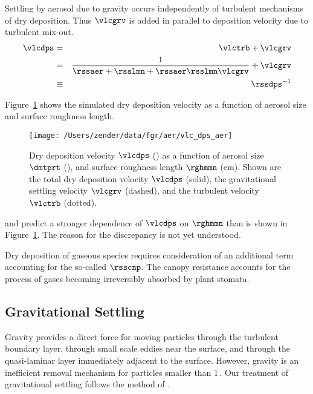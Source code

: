 \documentclass[12pt,twoside]{book}
\begin{document}
Settling by aerosol due to gravity occurs independently of turbulent 
mechanisms of dry deposition.
Thus $\vlcgrv$ is added in parallel to deposition velocity due to
turbulent mix-out.
\begin{eqnarray}
\vlcdps & = & \vlctrb + \vlcgrv \nonumber \\
\label{eqn:vlc_dps_dfn}
& = & \frac{1}{\rssaer + \rsslmn + \rssaer \rsslmn \vlcgrv } + \vlcgrv \\
\label{eqn:rss_dps_dfn}
& \equiv & \rssdps^{-1}
\end{eqnarray}

Figure~\ref{fgr:vlc_dps_aer} shows the simulated dry deposition velocity
as a function of aerosol size and surface roughness length.
\begin{figure*}
\begin{center}
\texttt{[image: /Users/zender/data/fgr/aer/vlc\_dps\_aer]}\vfill
\end{center}
\caption[Dry Deposition Velocity]{
Dry deposition velocity $\vlcdps$ (\cmxs) as a function of aerosol
size $\dmtprt$ (\um), and surface roughness length $\rghmmn$ (cm).
Shown are the total dry deposition velocity $\vlcdps$ (solid), 
the gravitational settling velocity $\vlcgrv$ (dashed), and the
turbulent velocity $\vlctrb$ (dotted).
\label{fgr:vlc_dps_aer}}
\end{figure*}
\cite{SeH78} and \cite{Seh80} predict a stronger dependence of
$\vlcdps$ on $\rghmmn$ than is shown in Figure~\ref{fgr:vlc_dps_aer}.
The reason for the discrepancy is not yet understood.

Dry deposition of gaseous species requires consideration of an
additional term accounting for the so-called  $\rsscnp$. 
The canopy resistance accounts for the process of gases becoming
irreversibly absorbed by plant stomata.

\subsection[Gravitational Settling]{Gravitational
Settling}\label{sxn:grv} 
Gravity provides a direct force for moving particles through the
turbulent boundary layer, through small scale eddies near the surface,
and through the quasi-laminar layer immediately adjacent to the
surface. 
However, gravity is an inefficient removal mechanism for particles
smaller than 1\,\um.
Our treatment of gravitational settling follows the method of
\cite{SeP97}. 
\end{document}
